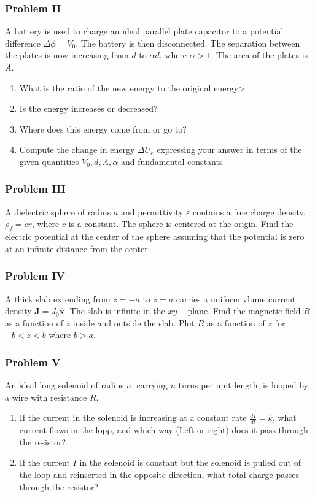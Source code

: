 \documentclass[oneside]{book}
\theoremstyle{definition}
\newcommand*\B[1]{\mathbf{#1}}
\newcommand*\Bh[1]{\mathbf{\hat{#1}}}
\begin{document}
\subsubsection{Problem II}
A battery is used to charge an ideal parallel plate capacitor to a potential difference $\Delta \phi = V_0$. The battery is then disconnected. The separation between the plates is now increasing from $d$ to $\alpha d$, where $\alpha >1$. The area of the plates is $A$.
\begin{enumerate}
\item What is the ratio of the new energy to the original energy>
\item Is the energy increases or decreased?
\item Where does this energy come from or go to?
\item Compute the change in energy $\Delta U_e$ expressing your answer in terms of the given quantities $V_0,d,A,\alpha$ and fundamental constants.
\end{enumerate}

\subsubsection{Problem III}
A dielectric sphere of radius $a$ and permittivity $\varepsilon$ contains a free charge density. $\rho_f = cr$, where $c$ is a constant. The sphere is centered at the origin. Find the electric potential at the center of the sphere assuming that the potential is zero at an infinite distance from the center.

\subsubsection{Problem IV}
A thick slab extending from $z=-a$ to $z=a$ carries a uniform vlume current density $\B{J} = J_0 \Bh{x}$. The slab is infinite in the $xy-$plane. Find the magnetic field $B$ as a function of $z$ inside and outside the slab. Plot $B$ as a function of $z$ for $-b<z<b$ where $b>a$.

\subsubsection{Problem V}
An ideal long solenoid of radius $a$, carrying $n$ turns per unit length, is looped by a wire with resistance $R$. 
\begin{enumerate}
\item If the current in the solenoid is increasing at a constant rate $\frac{dI}{dt} = k$, what current flows in the lopp, and which way (Left or right) does it pass through the resistor?
\item If the current $I$ in the solenoid is constant but the solenoid is pulled out of the loop and reinserted in the opposite direction, what total charge passes through the resistor?
\end{enumerate}
\end{document}
